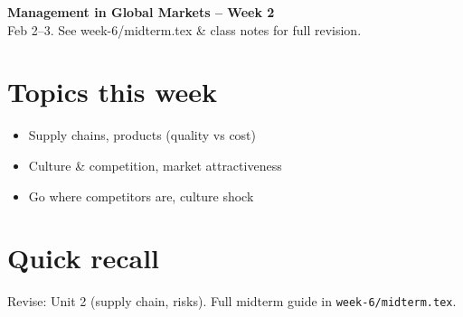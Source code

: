 \documentclass[10pt,a4paper]{article}
\begin{document}
\begin{center}
{\large\bfseries\color{eublue} Management in Global Markets -- Week 2}\\[0.2em]
\footnotesize Feb 2--3. See week-6/midterm.tex \& class notes for full revision.
\end{center}\vspace{0.5em}

\section*{\color{eublue}Topics this week}
\begin{itemize}
\item Supply chains, products (quality vs cost)
\item Culture \& competition, market attractiveness
\item Go where competitors are, culture shock
\end{itemize}

\section*{Quick recall}
Revise: Unit 2 (supply chain, risks). Full midterm guide in \texttt{week-6/midterm.tex}.
\end{document}
